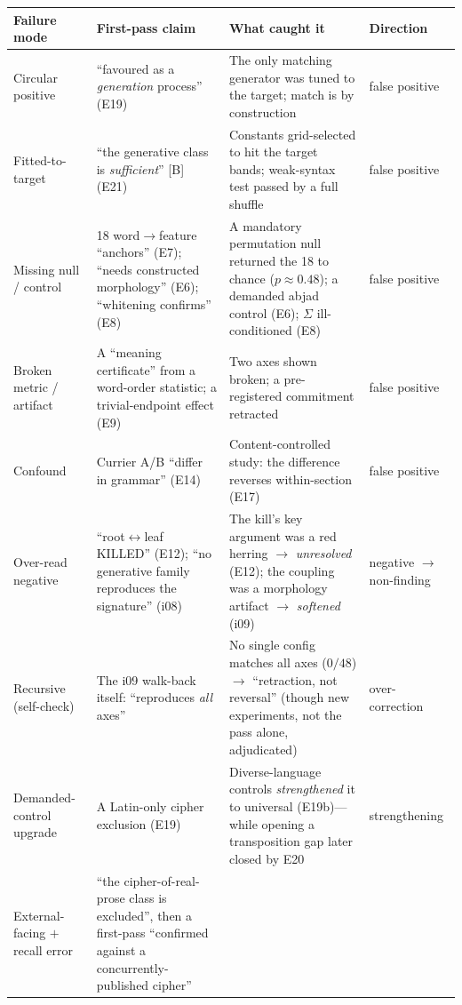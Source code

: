 \documentclass[11pt]{article}
\begin{document}
\begin{table}[t]\centering\small
\renewcommand{\arraystretch}{1.25}
\begin{tabular}{@{}p{2.5cm}p{4.4cm}p{4.2cm}p{2.2cm}@{}}
\toprule
\textbf{Failure mode} & \textbf{First-pass claim} & \textbf{What caught it} &
\textbf{Direction} \\
\midrule
Circular positive & ``favoured as a \emph{generation} process'' (E19) &
The only matching generator was tuned to the target; match is by construction &
false positive \\
Fitted-to-target & ``the generative class is \emph{sufficient}'' [B] (E21) &
Constants grid-selected to hit the target bands; weak-syntax test passed by a full shuffle &
false positive \\
Missing null / control & 18 word$\rightarrow$feature ``anchors'' (E7); ``needs constructed
morphology'' (E6); ``whitening confirms'' (E8) & A mandatory permutation null returned the 18
to chance ($p\!\approx\!0.48$); a demanded abjad control (E6); $\Sigma$ ill-conditioned (E8) &
false positive \\
Broken metric / artifact & A ``meaning certificate'' from a word-order statistic; a
trivial-endpoint effect (E9) & Two axes shown broken; a pre-registered commitment retracted &
false positive \\
Confound & Currier A/B ``differ in grammar'' (E14) & Content-controlled study: the
difference reverses within-section (E17) & false positive \\
Over-read negative & ``root$\leftrightarrow$leaf KILLED'' (E12); ``no generative family
reproduces the signature'' (i08) & The kill's key argument was a red herring $\rightarrow$
\emph{unresolved} (E12); the coupling was a morphology artifact $\rightarrow$ \emph{softened}
(i09) & negative $\rightarrow$ non-finding \\
Recursive (self-check) & The i09 walk-back itself: ``reproduces \emph{all} axes'' &
No single config matches all axes ($0/48$) $\rightarrow$ ``retraction, not reversal'' (though
new experiments, not the pass alone, adjudicated) & over-correction \\
Demanded-control upgrade & A Latin-only cipher exclusion (E19) & Diverse-language controls
\emph{strengthened} it to universal (E19b)---while opening a transposition gap later closed by
E20 & strengthening \\
External-facing $+$ recall error & ``the cipher-of-real-prose class is excluded'', then a
first-pass ``confirmed against a concurrently-published cipher'' \citep{greshko2025naibbe} &

\end{tabular}
\end{table}
\end{document}
